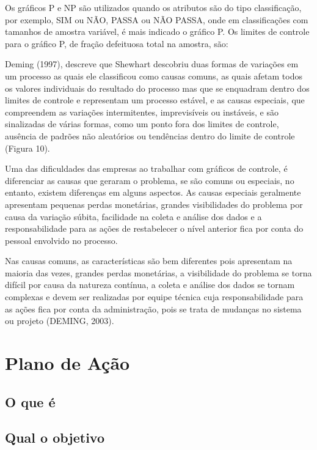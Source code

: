 \documentclass[
]{article}
\begin{document}
Os gráficos P e NP são utilizados quando os atributos são do tipo classificação, por exemplo, SIM ou NÃO, PASSA ou NÃO PASSA, onde em classificações com tamanhos de amostra variável, é mais indicado o gráfico P.
Os limites de controle para o gráfico P, de fração defeituosa total na
amostra, são:

Deming (1997), descreve que Shewhart descobriu duas formas de variações em um processo as quais ele classificou como causas comuns, as quais afetam todos os valores individuais do resultado do processo mas que se enquadram dentro dos limites de controle e representam um processo estável, e as causas especiais, que compreendem as variações intermitentes, imprevisíveis ou instáveis, e são sinalizadas de várias formas, como um ponto fora dos limites de controle, ausência de padrões não aleatórios ou tendências dentro do limite de controle (Figura 10).

Uma das dificuldades das empresas ao trabalhar com gráficos de controle, é diferenciar as causas que geraram o problema, se são comuns ou especiais, no entanto, existem diferenças em alguns aspectos. As causas especiais geralmente apresentam pequenas perdas monetárias, grandes visibilidades do problema por causa da variação súbita, facilidade na coleta e análise dos dados e a responsabilidade para as ações de restabelecer o nível anterior fica por conta do pessoal envolvido no processo.

Nas causas comuns, as características são bem diferentes pois apresentam na maioria das vezes, grandes perdas monetárias, a visibilidade do problema se torna difícil por causa da natureza contínua, a coleta e análise dos dados se tornam complexas e devem ser realizadas por equipe técnica cuja responsabilidade para as ações fica por conta da administração, pois se trata de mudanças no sistema ou projeto (DEMING, 2003).

\hypertarget{plano-de-auxe7uxe3o}{%
\section{Plano de Ação}\label{plano-de-auxe7uxe3o}}

\hypertarget{o-que-uxe9-7}{%
\subsection*{O que é}\label{o-que-uxe9-7}}

\hypertarget{qual-o-objetivo-7}{%
\subsection*{Qual o objetivo}\label{qual-o-objetivo-7}}
\end{document}
